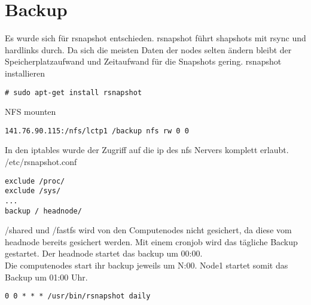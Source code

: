 \chapter{Backup}
Es wurde sich für rsnapshot entschieden. rsnapshot führt shapshots mit rsync und hardlinks durch.
Da sich die meisten Daten der nodes selten ändern bleibt der Speicherplatzaufwand und Zeitaufwand für die Snapshots gering.
rsnapshot installieren
\begin{lstlisting}[style=Bash]
# sudo apt-get install rsnapshot
\end{lstlisting}
NFS mounten
\begin{lstlisting}[style=Bash]
141.76.90.115:/nfs/lctp1 /backup nfs rw 0 0 
\end{lstlisting}
In den iptables wurde der Zugriff auf die ip des nfs Nervers komplett erlaubt.
/etc/rsnapshot.conf
\begin{lstlisting}[style=Bash]
exclude /proc/
exclude /sys/
...
backup / headnode/
\end{lstlisting}

/shared und /fastfs wird von den Computenodes nicht gesichert, da diese vom headnode bereits gesichert werden.
Mit einem cronjob wird das tägliche Backup gestartet. Der headnode startet das backup um 00:00. \\
Die computenodes start ihr backup jeweils um N:00. Node1 startet somit das Backup um 01:00 Uhr.
\begin{lstlisting}[style=Bash]
0 0 * * * /usr/bin/rsnapshot daily
\end{lstlisting}
